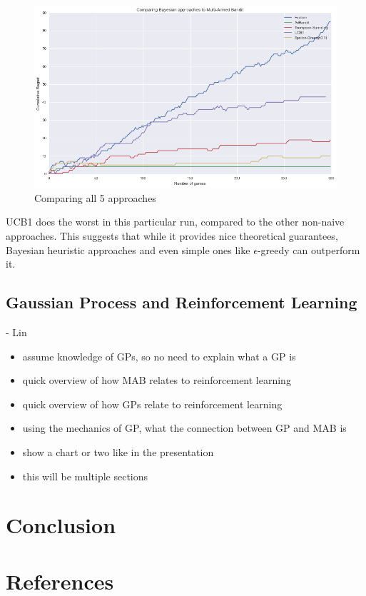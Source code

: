 \documentclass{article}
\begin{document}
\begin{figure}[H]
\centering
\includegraphics[scale=0.4]{all.png}
\caption{Comparing all 5 approaches}
\end{figure}

UCB1 does the worst in this particular run, compared to the other non-naive approaches. This suggests that while it provides nice theoretical guarantees, Bayesian heuristic approaches and even simple ones like $\epsilon$-greedy can outperform it.

\subsection{Gaussian Process and Reinforcement Learning}

- Lin
\begin{itemize}
\item assume knowledge of GPs, so no need to explain what a GP is
\item quick overview of how MAB relates to reinforcement learning
\item quick overview of how GPs relate to reinforcement learning
\item using the mechanics of GP, what the connection between GP and MAB is
\item show a chart or two like in the presentation
\item this will be multiple sections
\end{itemize}

\section{Conclusion}

\section{References}
\end{document}
